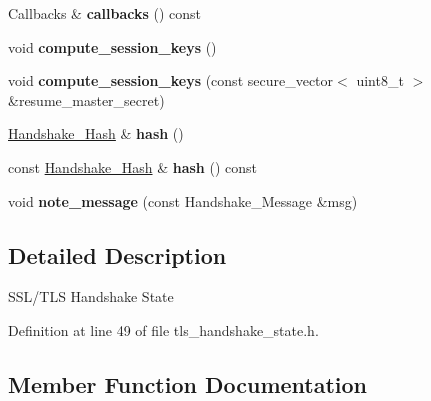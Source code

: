 \begin{DoxyCompactItemize}
Callbacks \& {\bfseries callbacks} () const
\item 
\mbox{\label{class_botan_1_1_t_l_s_1_1_handshake___state_acdc899557a7d7afd262f2b8190846e51}} 
void {\bfseries compute\+\_\+session\+\_\+keys} ()
\item 
\mbox{\label{class_botan_1_1_t_l_s_1_1_handshake___state_a664d8f12c26f5f8622c8e933420041aa}} 
void {\bfseries compute\+\_\+session\+\_\+keys} (const secure\+\_\+vector$<$ uint8\+\_\+t $>$ \&resume\+\_\+master\+\_\+secret)
\item 
\mbox{\label{class_botan_1_1_t_l_s_1_1_handshake___state_a014321051c6ce6d5b5cd706db9b1821f}} 
\mbox{\hyperlink{class_botan_1_1_t_l_s_1_1_handshake___hash}{Handshake\+\_\+\+Hash}} \& {\bfseries hash} ()
\item 
\mbox{\label{class_botan_1_1_t_l_s_1_1_handshake___state_ac038dd06e05ae0be9bdb30cba9bd8aba}} 
const \mbox{\hyperlink{class_botan_1_1_t_l_s_1_1_handshake___hash}{Handshake\+\_\+\+Hash}} \& {\bfseries hash} () const
\item 
\mbox{\label{class_botan_1_1_t_l_s_1_1_handshake___state_a290bfe2fc222ed6705bcb8ba2703bbc9}} 
void {\bfseries note\+\_\+message} (const Handshake\+\_\+\+Message \&msg)
\end{DoxyCompactItemize}


\subsection{Detailed Description}
S\+S\+L/\+T\+LS Handshake State 

Definition at line 49 of file tls\+\_\+handshake\+\_\+state.\+h.



\subsection{Member Function Documentation}
\mbox{\label{class_botan_1_1_t_l_s_1_1_handshake___state_aac3a4338494a5f63d72e419fbadd2b8f}} 
